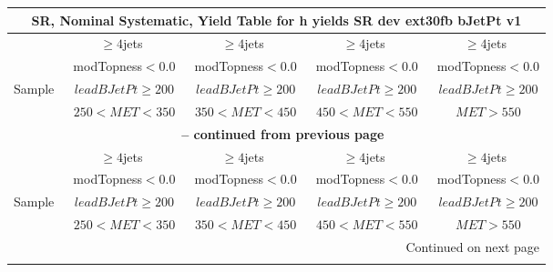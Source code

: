\documentclass{article}
\begin{document}
 
 
\begin{longtable}{|l|c|c|c|c|} 
 
\multicolumn{5}{c}{ SR, Nominal Systematic, Yield Table for h yields SR dev ext30fb bJetPt v1 }\\* \hline 
  & $\ge4$jets  & $\ge4$jets  & $\ge4$jets  & $\ge4$jets \\* 
  & ~modTopness$<0.0$  & ~modTopness$<0.0$  & ~modTopness$<0.0$  & ~modTopness$<0.0$ \\* 
Sample  & ~$leadBJetPt\ge200$  & ~$leadBJetPt\ge200$  & ~$leadBJetPt\ge200$  & ~$leadBJetPt\ge200$ \\* 
  & ~$250<MET<350$  & ~$350<MET<450$  & ~$450<MET<550$  & ~$MET>550$ \\* 
\hline \hline 
\endfirsthead 
 
\multicolumn{5}{c}{{\bfseries \tablename\ \thetable{} -- continued from previous page}}\\* \hline 
  & $\ge4$jets  & $\ge4$jets  & $\ge4$jets  & $\ge4$jets \\* 
  & ~modTopness$<0.0$  & ~modTopness$<0.0$  & ~modTopness$<0.0$  & ~modTopness$<0.0$ \\* 
Sample  & ~$leadBJetPt\ge200$  & ~$leadBJetPt\ge200$  & ~$leadBJetPt\ge200$  & ~$leadBJetPt\ge200$ \\* 
  & ~$250<MET<350$  & ~$350<MET<450$  & ~$450<MET<550$  & ~$MET>550$ \\* 
\hline \hline 
\endhead 
 
\multicolumn{5}{|r|}{{Continued on next page}}\\* \hline 
\endfoot 
 
 
\endlastfoot 
 

\end{longtable}
\end{document}
